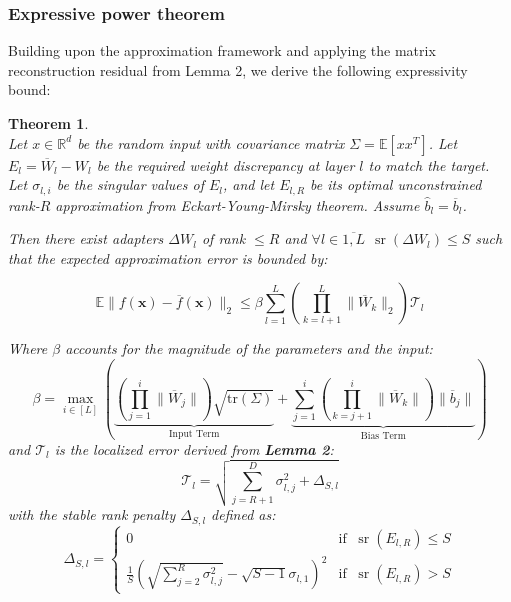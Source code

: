 \documentclass[a4paper,14pt]{extarticle}
\DeclareMathOperator{\sr}{sr}
\newtheorem{theorem}{Theorem}
\begin{document}
    \subsubsection{Expressive power theorem}
    
    Building upon the approximation framework and applying the matrix reconstruction residual from Lemma 2, we derive the following expressivity bound: \\

    \begin{theorem} $~$\\
        Let $x\in \mathbb{R}^d$ be the random input with covariance matrix $\Sigma = \mathbb{E}[xx^T]$.
        Let $E_l = \overline{W}_l - W_l$ be the required weight discrepancy at layer $l$ to match the target. Let $\sigma_{l,i}$ be the singular values of $E_l$, and let $E_{l,R}$ be its optimal unconstrained rank-$R$ approximation from Eckart-Young-Mirsky theorem. 
        Assume $\hat{b}_l = \overline{b}_l$. 
        
        Then there exist adapters $\Delta W_l$ of rank $\leqslant R$ and $\forall l \in\overline{1, L}~~\sr(\Delta W_l) \leqslant S$ such that the expected approximation error is bounded by:

        $$ \mathbb{E} \| f(\mathbf{x}) - \overline{f}(\mathbf{x}) \|_2 \leqslant \beta \sum_{l=1}^L \left( \prod_{k=l+1}^L \| \overline{W}_k \|_2 \right) \mathcal{T}_l $$

        Where $\beta$ accounts for the magnitude of the parameters and the input:
        $$ \beta = \max_{i \in [L]} \left( \underbrace{ \left( \prod_{j=1}^i \|\overline{W}_j\| \right) \sqrt{\text{tr}(\Sigma)} }_{\text{Input Term}} + \underbrace{ \sum_{j=1}^i \left( \prod_{k=j+1}^i \|\overline{W}_k\| \right) \|\overline{b}_j\| }_{\text{Bias Term}} \right) $$ 
        and $\mathcal{T}_l$ is the localized error derived from \textbf{Lemma 2}:
        $$ \mathcal{T}_l = \sqrt{ \sum_{j=R+1}^D \sigma_{l,j}^2 + \Delta_{S,l} } $$
        with the stable rank penalty $\Delta_{S,l}$ defined as:
        $$ \Delta_{S,l} = \begin{cases} 0 & \text{if } ~ \sr(E_{l,R}) \leqslant S \\ \frac{1}{S}\left(\sqrt{\sum\limits_{j=2}^R\sigma_{l,j}^2} - \sqrt{S - 1}\sigma_{l,1}\right)^2 & \text{if } ~ \sr(E_{l,R}) > S \end{cases} $$

    \end{theorem}
\end{document}
